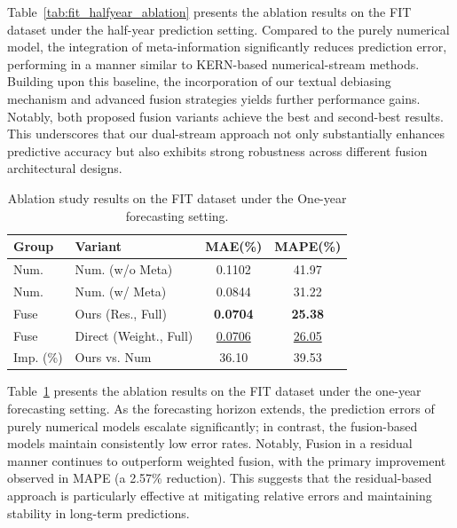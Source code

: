 \documentclass[Afour,sageh,times]{sagej}
\begin{document}
{%
Table~\ref{tab:fit_halfyear_ablation} presents the ablation results on the FIT dataset under the half-year prediction setting. Compared to the purely numerical model, the integration of meta-information significantly reduces prediction error, performing in a manner similar to KERN-based numerical-stream methods. Building upon this baseline, the incorporation of our textual debiasing mechanism and advanced fusion strategies yields further performance gains. Notably, both proposed fusion variants achieve the best and second-best results. This underscores that our dual-stream approach not only substantially enhances predictive accuracy but also exhibits strong robustness across different fusion architectural designs.

\begin{table}[t]
\centering
\caption{Ablation study results on the FIT dataset under the One-year forecasting setting.}
\label{tab:fit_oneyear_ablation}
\begin{tabular}{l l c c}
\hline
\textbf{Group} & \textbf{Variant} & \textbf{MAE(\%)} & \textbf{MAPE(\%)} \\
\hline
Num. & Num. (w/o Meta) & 0.1102 & 41.97 \\
Num. & Num. (w/ Meta) & 0.0844 & 31.22 \\
Fuse & Ours (Res., Full) & \textbf{0.0704} & \textbf{25.38}\\
Fuse & Direct (Weight., Full) & \underline{0.0706} & \underline{26.05} \\
\hline
Imp. (\%) & Ours vs. Num  & 36.10	& 39.53 \\
\hline
\end{tabular}
\end{table}


Table~\ref{tab:fit_oneyear_ablation} presents the ablation results on the FIT dataset under the one-year forecasting setting. As the forecasting horizon extends, the prediction errors of purely numerical models escalate significantly; in contrast, the fusion-based models maintain consistently low error rates. Notably, Fusion in a residual manner continues to outperform weighted fusion, with the primary improvement observed in MAPE (a 2.57\% reduction). This suggests that the residual-based approach is particularly effective at mitigating relative errors and maintaining stability in long-term predictions.

}
\end{document}
